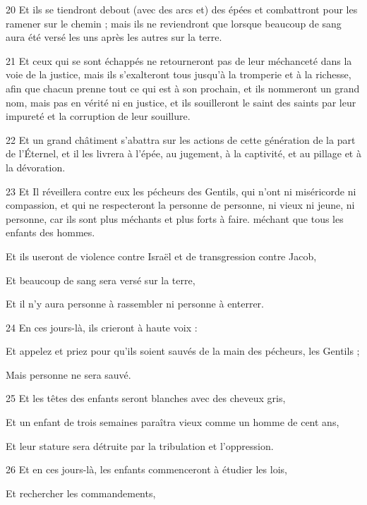 \par 20 Et ils se tiendront debout (avec des arcs et) des épées et combattront pour les ramener sur le chemin ; mais ils ne reviendront que lorsque beaucoup de sang aura été versé les uns après les autres sur la terre.
\par 21 Et ceux qui se sont échappés ne retourneront pas de leur méchanceté dans la voie de la justice, mais ils s'exalteront tous jusqu'à la tromperie et à la richesse, afin que chacun prenne tout ce qui est à son prochain, et ils nommeront un grand nom, mais pas en vérité ni en justice, et ils souilleront le saint des saints par leur impureté et la corruption de leur souillure.
\par 22 Et un grand châtiment s'abattra sur les actions de cette génération de la part de l'Éternel, et il les livrera à l'épée, au jugement, à la captivité, et au pillage et à la dévoration.
\par 23 Et Il réveillera contre eux les pécheurs des Gentils, qui n'ont ni miséricorde ni compassion, et qui ne respecteront la personne de personne, ni vieux ni jeune, ni personne, car ils sont plus méchants et plus forts à faire. méchant que tous les enfants des hommes.
\par    
\par     Et ils useront de violence contre Israël et de transgression contre Jacob,  
\par     Et beaucoup de sang sera versé sur la terre,  
\par     Et il n’y aura personne à rassembler ni personne à enterrer.
\par    
\par 24 En ces jours-là, ils crieront à haute voix :  
\par     Et appelez et priez pour qu'ils soient sauvés de la main des pécheurs, les Gentils ;  
\par     Mais personne ne sera sauvé.
\par    
\par 25 Et les têtes des enfants seront blanches avec des cheveux gris,  
\par     Et un enfant de trois semaines paraîtra vieux comme un homme de cent ans,  
\par     Et leur stature sera détruite par la tribulation et l'oppression.
\par    
\par 26 Et en ces jours-là, les enfants commenceront à étudier les lois,  
\par     Et rechercher les commandements,  
